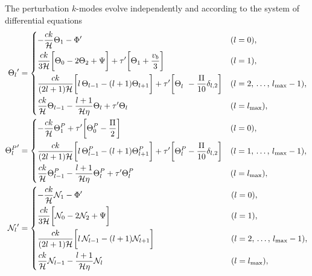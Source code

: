 \documentclass[10pt,a4paper]{article}
\begin{document}
The perturbation $k$-modes evolve independently and according to the system of differential equations
\begin{subequations}
\allowdisplaybreaks
\begin{align}
	{\Theta_l}^\prime   &= \begin{dcases}
	                       -\frac{ck}{\aH} \Theta_1 - \Phi^\prime & (l=0), \\
	                       \frac{ck}{3\aH} \bigg[ \Theta_0 - 2 \Theta_2 + \Psi \bigg] + \tau^\prime \bigg[ \Theta_1 + \frac{v_b}{3} \bigg] & (l=1), \\
	                       \frac{ck}{(2l+1)\aH} \bigg[ l \, \Theta_{l-1} - (l+1) \Theta_{l+1} \bigg] + \tau^\prime \bigg[ \Theta^{\phantom{P}}_l - \frac{\Pi}{10} \delta_{l,2} \bigg] & (l = 2,\, \ldots,\, l_\text{max}-1), \\
	                       \frac{ck}{\aH} \Theta_{l-1} - \frac{l+1}{\aH \eta} \Theta_l + \tau^\prime \Theta_l & (l=l_\text{max}), \\
	                       \end{dcases} \\
	{\Theta^P_l}^\prime &= \begin{dcases}
	                       -\frac{ck}{\aH} \Theta^P_1 + \tau^\prime \bigg[ \Theta^P_0 - \frac{\Pi}{2} \bigg] & (l=0), \\
	                       \frac{ck}{(2l+1)\aH} \bigg[ l \, \Theta^P_{l-1} - (l+1) \Theta^P_{l+1} \bigg] + \tau^\prime \bigg[ \Theta^P_l - \frac{\Pi}{10} \delta_{l,2} \bigg] & (l = 1,\, \ldots,\, l_\text{max}-1), \\
	                       \frac{ck}{\aH} \Theta^P_{l-1} - \frac{l+1}{\aH \eta} \Theta^P_l + \tau^\prime \Theta^P_l & (l=l_\text{max}), \\
	                       \end{dcases} \\
	{\N_l}^\prime       &= \begin{dcases}
	                       -\frac{ck}{\aH} \N_1 - \Phi^\prime & (l=0), \\
	                       \frac{ck}{3\aH} \bigg[ \N_0 - 2 \N_2 + \Psi \bigg] & (l=1) , \\
	                       \frac{ck}{(2l+1)\aH} \bigg[ l \, \N_{l-1} - (l+1) \N_{l+1} \bigg] \phantom{ {} + \tau^\prime \bigg[ \Theta^P_l - \frac{\Pi}{10} \delta_{l,2} \bigg]} & (l=2,\, \ldots,\, l_\text{max}-1), \\
	                       \frac{ck}{\aH} \N_{l-1} - \frac{l+1}{\aH \eta} \N_l & (l=l_\text{max}),

\end{dcases}
\end{align}
\end{subequations}
\end{document}
